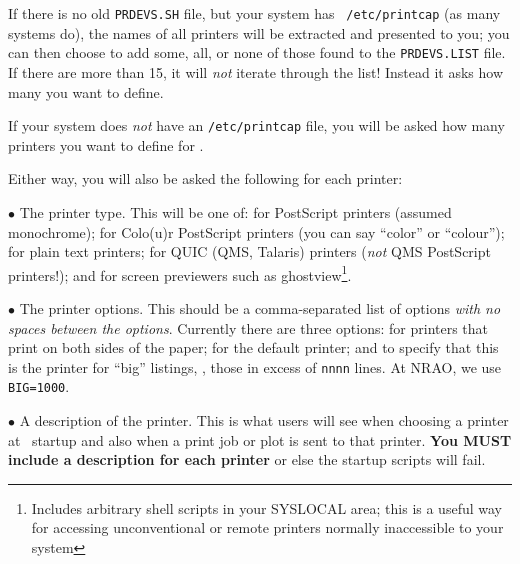 If there is no old {\tt PRDEVS.SH} file, but your system has {\tt
/etc/printcap} (as many systems do), the names of all printers will be
extracted and presented to you; you can then choose to add some, all, or
none of those found to the {\tt PRDEVS.LIST} file.  If there are more
than 15, it will {\it not\/} iterate through the list!  Instead it asks
how many you want to define.

If your system does {\it not\/} have an {\tt /etc/printcap} file, you
will be asked how many printers you want to define for \AIPS.

Either way, you will also be asked the following for each
printer:\medskip

\item{$\bullet$} The printer type.  This will be one of:
   for PostScript printers (assumed
                                monochrome);
   for Colo(u)r PostScript
                                printers (you can say ``color'' or
                                ``colour'');
   for plain text printers;
   for QUIC (QMS, Talaris) printers
                                ({\it not\/} QMS PostScript printers!);
                                and
   for screen previewers such as
                                ghostview\footnote*{\eightrm Includes
                                arbitrary shell scripts in your SYSLOCAL
                                area; this is a useful way for accessing
                                unconventional or remote printers
                                normally inaccessible to your system}.
\item{$\bullet$} The printer options.  This should be a comma-separated
                list of options {\it with no spaces between the
                options\/}.  Currently there are three options:
   for printers that print on both
                                sides of the paper;
   for the default printer; and
   to specify that this is the
                                printer for ``big'' listings, \ie, those
                                in excess of {\tt nnnn} lines.  At NRAO,
                                we use {\tt BIG=1000}.
\item{$\bullet$} A description of the printer.  This is what users will
        see when choosing a printer at \AIPS\ startup and also when a
        print job or plot is sent to that printer.  {\bf You MUST
        include a description for each printer} or else the startup
        scripts will fail.
\medskip

